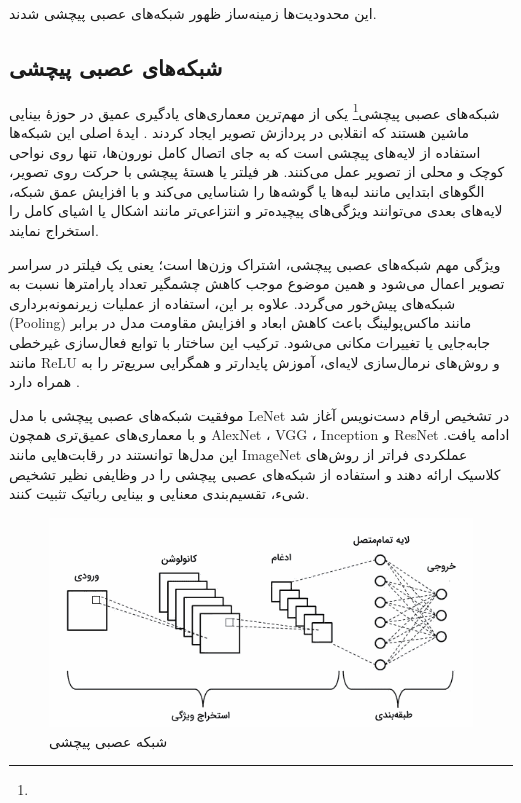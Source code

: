   

این محدودیت‌ها زمینه‌ساز ظهور شبکه‌های عصبی پیچشی شدند.  




\subsection{شبکه‌های عصبی پیچشی}
شبکه‌های عصبی پیچشی\footnote{} یکی از مهم‌ترین معماری‌های یادگیری عمیق در حوزهٔ بینایی ماشین هستند که انقلابی در پردازش تصویر ایجاد کردند \cite{lecun1998gradient}. ایدهٔ اصلی این شبکه‌ها استفاده از لایه‌های پیچشی است که به جای اتصال کامل نورون‌ها، تنها روی نواحی کوچک و محلی از تصویر عمل می‌کنند. هر فیلتر یا هستهٔ پیچشی با حرکت روی تصویر، الگوهای ابتدایی مانند لبه‌ها یا گوشه‌ها را شناسایی می‌کند و با افزایش عمق شبکه، لایه‌های بعدی می‌توانند ویژگی‌های پیچیده‌تر و انتزاعی‌تر مانند اشکال یا اشیای کامل را استخراج نمایند.  

ویژگی مهم شبکه‌های عصبی پیچشی، اشتراک وزن‌ها است؛ یعنی یک فیلتر در سراسر تصویر اعمال می‌شود و همین موضوع موجب کاهش چشمگیر تعداد پارامترها نسبت به شبکه‌های پیش‌خور می‌گردد. علاوه بر این، استفاده از عملیات زیرنمونه‌برداری (Pooling) مانند ماکس‌پولینگ باعث کاهش ابعاد و افزایش مقاومت مدل در برابر جابه‌جایی یا تغییرات مکانی می‌شود. ترکیب این ساختار با توابع فعال‌سازی غیرخطی مانند ReLU و روش‌های نرمال‌سازی لایه‌ای، آموزش پایدارتر و همگرایی سریع‌تر را به همراه دارد \cite{krizhevsky2012imagenet,he2016deep}.  

موفقیت شبکه‌های عصبی پیچشی با مدل LeNet در تشخیص ارقام دست‌نویس آغاز شد \cite{lecun1998gradient} و با معماری‌های عمیق‌تری همچون AlexNet \cite{krizhevsky2012imagenet}، VGG \cite{simonyan2015very}، Inception \cite{szegedy2015going} و ResNet \cite{he2016deep} ادامه یافت. این مدل‌ها توانستند در رقابت‌هایی مانند ImageNet عملکردی فراتر از روش‌های کلاسیک ارائه دهند و استفاده از شبکه‌های عصبی پیچشی را در وظایفی نظیر تشخیص شیء، تقسیم‌بندی معنایی و بینایی رباتیک تثبیت کنند.  




\begin{figure}[h]
	\centering
	\begin{minipage}[b]{0.8\textwidth}
		\centering
		\includegraphics[width=\textwidth]{transformer_images/convolution_new.png}
		\caption{شبکه عصبی پیچشی}
		\label{fig:convolution}
	\end{minipage}
	\hfill
\end{figure}



